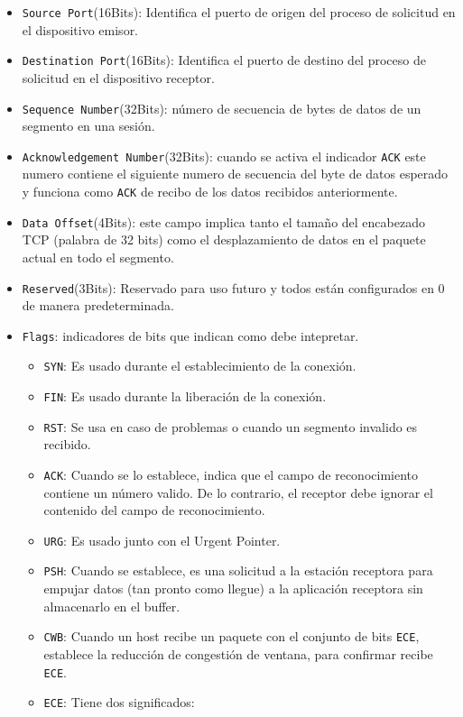 \begin{itemize}
\item \texttt{Source Port}(16Bits): Identifica el puerto de origen del proceso de solicitud en el dispositivo emisor.
\item \texttt{Destination Port}(16Bits): Identifica el puerto de destino del proceso de solicitud en el dispositivo receptor.
\item \texttt{Sequence Number}(32Bits): número de secuencia de bytes de datos de un segmento en una sesión.
\item \texttt{Acknowledgement Number}(32Bits): cuando se activa el indicador \texttt{ACK} este numero contiene el siguiente numero de secuencia del byte de datos esperado y funciona como \texttt{ACK} de recibo de los datos recibidos anteriormente.
\item \texttt{Data Offset}(4Bits): este campo implica tanto el tamaño del encabezado TCP (palabra de 32 bits) como el desplazamiento de datos en el paquete actual en todo el segmento.
\item \texttt{Reserved}(3Bits): Reservado para uso futuro y todos están configurados en 0 de manera predeterminada.
\item \texttt{Flags}: indicadores de bits que indican como debe intepretar.
\begin{itemize}
\item \texttt{SYN}: Es usado durante el establecimiento de la conexión.
\item \texttt{FIN}: Es usado durante la liberación de la conexión.
\item \texttt{RST}: Se usa en caso de problemas o cuando un segmento invalido es recibido.
\item \texttt{ACK}: Cuando se lo establece, indica que el campo de reconocimiento contiene un número valido. De lo contrario, el receptor debe ignorar el contenido del campo de reconocimiento.
\item \texttt{URG}: Es usado junto con el Urgent Pointer.
\item \texttt{PSH}: Cuando se establece, es una solicitud a la estación receptora para empujar datos (tan pronto como llegue) a la aplicación receptora sin almacenarlo en el buffer.
\item \texttt{CWB}: Cuando un host recibe un paquete con el conjunto de bits \texttt{ECE}, establece la reducción de congestión de ventana, para confirmar recibe \texttt{ECE}.
\item \texttt{ECE}: Tiene dos significados:
\begin{itemize}

\end{itemize}
\end{itemize}
\end{itemize}
